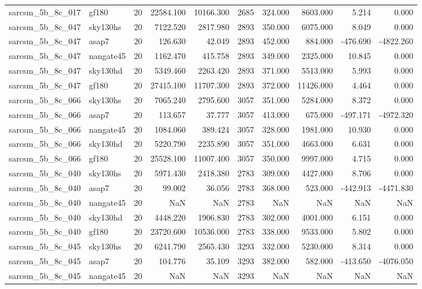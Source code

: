 \begin{tabular}{llrrrrrrrr}
sarcsm\_5b\_8c\_017 & gf180 & 20 & 22584.100 & 10166.300 & 2685 & 324.000 & 8603.000 & 5.214 & 0.000 \\
sarcsm\_5b\_8c\_047 & sky130hs & 20 & 7122.520 & 2817.980 & 2893 & 350.000 & 6075.000 & 8.049 & 0.000 \\
sarcsm\_5b\_8c\_047 & asap7 & 20 & 126.630 & 42.049 & 2893 & 452.000 & 884.000 & -476.690 & -4822.260 \\
sarcsm\_5b\_8c\_047 & nangate45 & 20 & 1162.470 & 415.758 & 2893 & 349.000 & 2325.000 & 10.845 & 0.000 \\
sarcsm\_5b\_8c\_047 & sky130hd & 20 & 5349.460 & 2263.420 & 2893 & 371.000 & 5513.000 & 5.993 & 0.000 \\
sarcsm\_5b\_8c\_047 & gf180 & 20 & 27415.100 & 11707.300 & 2893 & 372.000 & 11426.000 & 4.464 & 0.000 \\
sarcsm\_5b\_8c\_066 & sky130hs & 20 & 7065.240 & 2795.600 & 3057 & 351.000 & 5284.000 & 8.372 & 0.000 \\
sarcsm\_5b\_8c\_066 & asap7 & 20 & 113.657 & 37.777 & 3057 & 413.000 & 675.000 & -497.171 & -4972.320 \\
sarcsm\_5b\_8c\_066 & nangate45 & 20 & 1084.060 & 389.424 & 3057 & 328.000 & 1981.000 & 10.930 & 0.000 \\
sarcsm\_5b\_8c\_066 & sky130hd & 20 & 5220.790 & 2235.890 & 3057 & 351.000 & 4663.000 & 6.631 & 0.000 \\
sarcsm\_5b\_8c\_066 & gf180 & 20 & 25528.100 & 11007.400 & 3057 & 350.000 & 9997.000 & 4.715 & 0.000 \\
sarcsm\_5b\_8c\_040 & sky130hs & 20 & 5971.430 & 2418.380 & 2783 & 309.000 & 4427.000 & 8.706 & 0.000 \\
sarcsm\_5b\_8c\_040 & asap7 & 20 & 99.002 & 36.056 & 2783 & 368.000 & 523.000 & -442.913 & -4471.830 \\
sarcsm\_5b\_8c\_040 & nangate45 & 20 & NaN & NaN & 2783 & NaN & NaN & NaN & NaN \\
sarcsm\_5b\_8c\_040 & sky130hd & 20 & 4448.220 & 1906.830 & 2783 & 302.000 & 4001.000 & 6.151 & 0.000 \\
sarcsm\_5b\_8c\_040 & gf180 & 20 & 23720.600 & 10536.000 & 2783 & 338.000 & 9533.000 & 5.802 & 0.000 \\
sarcsm\_5b\_8c\_045 & sky130hs & 20 & 6241.790 & 2565.430 & 3293 & 332.000 & 5230.000 & 8.314 & 0.000 \\
sarcsm\_5b\_8c\_045 & asap7 & 20 & 104.776 & 35.109 & 3293 & 382.000 & 582.000 & -413.650 & -4076.050 \\
sarcsm\_5b\_8c\_045 & nangate45 & 20 & NaN & NaN & 3293 & NaN & NaN & NaN & NaN \\

\end{tabular}
